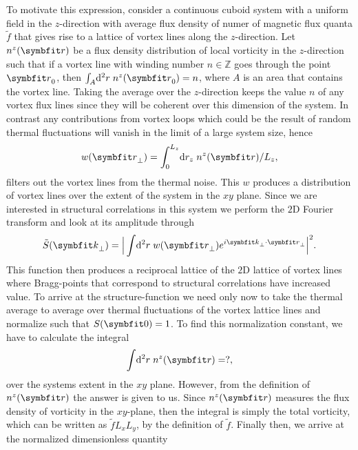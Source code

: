 To motivate this expression, consider a continuous cuboid system with a uniform field in the $z$-direction with average flux density of numer of magnetic flux quanta $\tilde{f}$ that gives rise to a lattice of vortex
lines along the $z$-direction. Let $n^z(\v{r})$ be a flux density distribution of local vorticity in the $z$-direction such that if a vortex line with winding number $n\in\mathbb{Z}$ goes through the point $\v{r}_0$,
then $\int_A\!\mathrm{d}^2r\;n^z(\v{r}_0) = n$, where $A$ is an area that contains the vortex line.
Taking the average over the $z$-direction keeps the value $n$ of any vortex flux lines since they will be coherent over this
dimension of the system. In contrast any contributions from vortex loops which could be the result of random thermal fluctuations will vanish in the limit of a large system size, hence
\begin{equation}
    w(\v{r}_\perp) = \int_0^{L_z}\!\mathrm{d}r_z\;n^z(\v{r}) / L_z,
    \label{eq:Vor:Symm:SF:Cont:xyDist}
\end{equation}
filters out the vortex lines from the thermal noise. This $w$ produces a distribution of vortex lines over the extent of the system in the $xy$ plane.
Since we are interested in structural correlations in this system we perform the $2$D Fourier transform and look at its amplitude through
\begin{equation}
    \label{eq:Vor:Symm:SF:Cont:unnormalized}
    \tilde{S}(\v{k}_\perp) = \Big|\int\!\mathrm{d}^2r\;w(\v{r}_\perp)e^{i\v{k}_\perp\cdot\v{r}_\perp}\Big|^2.
\end{equation}
This function then produces a reciprocal lattice of the $2$D lattice of vortex lines where Bragg-points that correspond to structural correlations have increased value. To arrive at the structure-function
we need only now to take the thermal average to average over thermal fluctuations of the vortex lattice lines and normalize such that $S(\v{0})=1$. To find this normalization constant, we have to
calculate the integral
\begin{equation}
    \label{eq:Vor:Symm:SF:Cont:normalizationInt}
    \int\!\mathrm{d}^2r\;n^z(\v{r}) = ?,
\end{equation}
over the systems extent in the $xy$ plane. However, from the definition of $n^z(\v{r})$ the answer is given to us. Since $n^z(\v{r})$ measures the flux density of vorticity in the $xy$-plane, then the integral is simply the total vorticity,
which can be written as $\tilde{f}L_xL_y$, by the definition of $\tilde{f}$. Finally then, we arrive at the normalized dimensionless quantity
